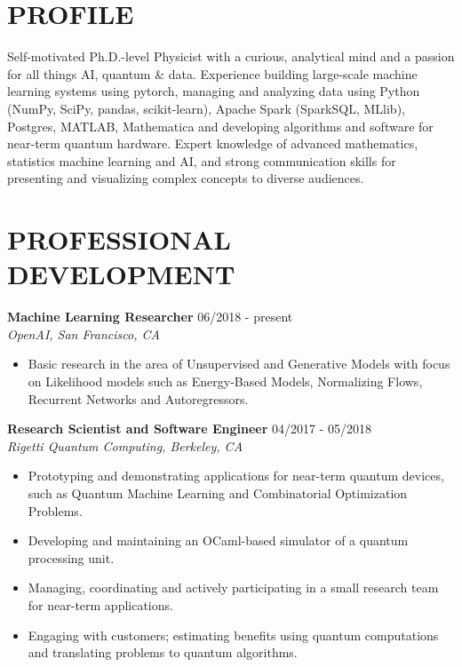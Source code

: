 \documentclass[10pt,centered]{./res} %
\begin{document}
\vspace*{-1.5cm}
\begin{resume}
\vspace{0.4cm}

\section{\color{ResumeBlue}PROFILE}
Self-motivated Ph.D.-level Physicist with a curious, analytical mind and a passion for all things AI, quantum \& data. Experience building large-scale machine learning systems using pytorch, managing and analyzing data using Python (NumPy, SciPy, pandas, scikit-learn), Apache Spark (SparkSQL, MLlib), Postgres, MATLAB, {\sc Mathematica} and developing algorithms and software for near-term quantum hardware. Expert knowledge of advanced mathematics, statistics machine learning and AI, and strong communication skills for presenting and visualizing complex concepts to diverse audiences.

\section{\color{ResumeBlue}PROFESSIONAL DEVELOPMENT}
{\bf Machine Learning Researcher} \hfill06/2018 - present \\
{\it OpenAI, San Francisco, CA}
\begin{itemize}
  \item Basic research in the area of Unsupervised and Generative Models with focus on Likelihood models such as Energy-Based Models, Normalizing Flows, Recurrent Networks and Autoregressors.
\end{itemize}

{\bf Research Scientist and Software Engineer} \hfill04/2017 - 05/2018 \\
{\it Rigetti Quantum Computing, Berkeley, CA}
\begin{itemize}
  \item Prototyping and demonstrating applications for near-term quantum devices, such as Quantum Machine Learning and Combinatorial Optimization Problems.
  \item Developing and maintaining an OCaml-based simulator of a quantum processing unit.
  \item Managing, coordinating and actively participating in a small research team for near-term applications.
  \item Engaging with customers; estimating benefits using quantum computations and translating problems to quantum algorithms.
\end{itemize}


\end{resume}
\end{document}
